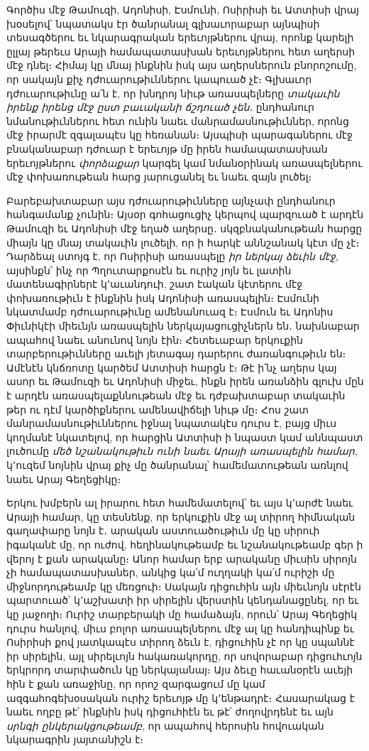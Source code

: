 \documentclass{article}
\begin{document}
{Գործիս մէջ Թամուզի, Ադոնիսի, Էսմունի, Ոսիրիսի եւ Ատտիսի վրայ խօսելով՝ նպատակս էր ծանրանալ գլխաւորաբար այնպիսի տեսագծերու եւ նկարագրական երեւոյթներու վրայ, որոնք կարելի ըլլայ թերեւս Արայի համապատասխան երեւոյթներու հետ աղերսի մէջ դնել։ Հիմայ կը մնայ ինքնին իսկ այս աղերսներուն բնորոշումը, որ սակայն քիչ դժուարութիւններու կապուած չէ։ Գլխաւոր դժուարութիւնը ա՛ն է, որ խնդրոյ նիւթ առասպելները \emph{տակաւին իրենք իրենց մէջ ըստ բաւականի ճշդուած չեն}․ ընդհանուր նմանութիւններու հետ ունին նաեւ մանրամասնութիւններ, որոնց մէջ իրարմէ զգալապէս կը հեռանան։ Այսպիսի պարագաներու մէջ բնականաբար դժուար է երեւոյթ մը իրեն համապատասխան երեւոյթներու \emph{փորձաքար} կարգել կամ նմանօրինակ առասպելներու մէջ փոխառութեան հարց յարուցանել եւ նաեւ զայն լուծել։

Բարեբախտաբար այս դժուարութիւնները այնչափ ընդհանուր հանգամանք չունին։ Այսօր գոհացուցիչ կերպով պարզուած է արդէն Թամուզի եւ Ադոնիսի մէջ եղած աղերսը․ սկզբնականութեան հարցը միայն կը մնայ տակաւին լուծելի, որ ի հարկէ աննշանակ կէտ մը չէ։ Դարձեալ ստոյգ է, որ Ոսիրիսի առասպելը \emph{իր ներկայ ձեւին մէջ}, այսինքն՝ ինչ որ Պղուտարքոսէն եւ ուրիշ յոյն եւ լատին մատենագիրներէ կ՚աւանդուի, շատ էական կէտերու մէջ փոխառութիւն է ինքնին իսկ Ադոնիսի առասպելին։ Էսմունի նկատմամբ դժուարութիւնը ամենանուազ է։ Էսմուն եւ Ադոնիս Փիւնիկէի միեւնյն առասպելին ներկայացուցիչներն են․ նախնաբար ապահով նաեւ անունով նոյն էին։ Հետեւաբար երկուքին տարբերութիւնները աւելի յետագայ դարերու ժառանգութիւն են։ Ամէնէն կնճռոտը կարծեմ Ատտիսի հարցն է։ Թէ ի՛նչ աղերս կայ ասոր եւ Թամուզի եւ Ադոնիսի միջեւ, ինքն իրեն առանձին գլուխ մըն է արդէն առասպելաքննութեան մէջ եւ դժբախտաբար տակաւին թեր ու դէմ կարծիքներու ամենավիճելի նիւթ մը։ Հոս շատ մանրամասնութիւններու իջնալ նպատակէս դուրս է, բայց միւս կողմանէ նկատելով, որ հարցին Ատտիսի ի նպաստ կամ աննպաստ լուծումը \emph{մեծ նշանակութիւն ունի նաեւ Արայի առասպելին համար}, կ՚ուզեմ նոյնին վրայ քիչ մը ծանրանալ՝ համեմատութեան առնլով նաեւ Արայ Գեղեցիկը։

Երկու խմբերն ալ իրարու հետ համեմատելով՝ եւ այս կ՚արժէ նաեւ Արայի համար, կը տեսնենք, որ երկուքին մէջ ալ տիրող հիմնական գաղափարը նոյն է․ արական աստուածութիւն մը կը սիրուի իգականէ մը, որ ուժով, հեղինակութեամբ եւ նշանակութեամբ գեր ի վերոյ է քան արականը։ Անոր համար երբ արականը միւսին սիրոյն չի համապատասխաներ, անկից կա՛մ ուղղակի կա՛մ ուրիշի մը միջնորդութեամբ կը մեռցուի։ Սակայն դիցուհին այն միեւնոյն սէրէն պարտուած՝ կ՚աշխատի իր սիրելին վերստին կենդանացընել, որ եւ կը յաջողի։ Ուրիշ տարբերակի մը համաձայն, որուն՝ Արայ Գեղեցիկ դուրս հանլով, միւս բոլոր առասպելներու մէջ ալ կը հանդիպինք եւ Ոսիրիսի քով յատկապէս տիրող ձեւն է, դիցուհին չէ որ կը սպաննէ իր սիրելին, այլ սիրելւոյն հակառակորդը, որ սովորաբար դիցուհւոյն երկրորդ տարփածուն կը ներկայանայ։ Այս ձեւը հաւանօրէն աւեյի հին է քան առաջինը, որ որոշ զարգացում մը կամ ազգահոգեխօսական ուրիշ երեւոյթ մը կ՚ենթադրէ։ Հասարակաց է նաեւ ողբը թէ՛ ինքնին իսկ դիցուհիէն եւ թէ՛ ժողովրդենէ եւ այն \emph{սրնգի ընկերակցութեամբ}, որ ապահով հերոսին հովուական նկարագրին յայտանիշն է։

}
\end{document}
